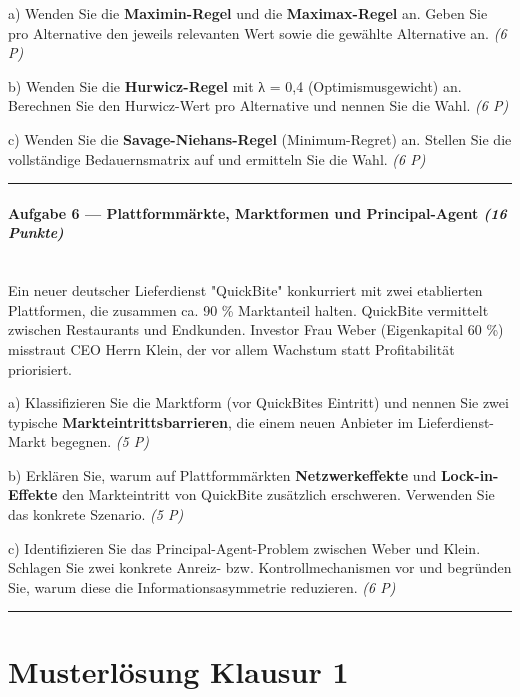 \documentclass[11pt, a4paper]{article}
\begin{document}
a) Wenden Sie die \textbf{Maximin-Regel} und die \textbf{Maximax-Regel} an. Geben Sie pro Alternative den jeweils relevanten Wert sowie die gewählte Alternative an. \textit{(6 P)}


b) Wenden Sie die \textbf{Hurwicz-Regel} mit λ = 0,4 (Optimismusgewicht) an. Berechnen Sie den Hurwicz-Wert pro Alternative und nennen Sie die Wahl. \textit{(6 P)}


c) Wenden Sie die \textbf{Savage-Niehans-Regel} (Minimum-Regret) an. Stellen Sie die vollständige Bedauernsmatrix auf und ermitteln Sie die Wahl. \textit{(6 P)}



\noindent\textcolor{rulegray}{\rule{\linewidth}{0.4pt}}


\paragraph{Aufgabe 6 — Plattformmärkte, Marktformen und Principal-Agent \textit{(16 Punkte)}}\mbox{}\\[2pt]

Ein neuer deutscher Lieferdienst "QuickBite" konkurriert mit zwei etablierten Plattformen, die zusammen ca. 90 \% Marktanteil halten. QuickBite vermittelt zwischen Restaurants und Endkunden. Investor Frau Weber (Eigenkapital 60 \%) misstraut CEO Herrn Klein, der vor allem Wachstum statt Profitabilität priorisiert.


a) Klassifizieren Sie die Marktform (vor QuickBites Eintritt) und nennen Sie zwei typische \textbf{Markteintrittsbarrieren}, die einem neuen Anbieter im Lieferdienst-Markt begegnen. \textit{(5 P)}


b) Erklären Sie, warum auf Plattformmärkten \textbf{Netzwerkeffekte} und \textbf{Lock-in-Effekte} den Markteintritt von QuickBite zusätzlich erschweren. Verwenden Sie das konkrete Szenario. \textit{(5 P)}


c) Identifizieren Sie das Principal-Agent-Problem zwischen Weber und Klein. Schlagen Sie zwei konkrete Anreiz- bzw. Kontrollmechanismen vor und begründen Sie, warum diese die Informationsasymmetrie reduzieren. \textit{(6 P)}



\noindent\textcolor{rulegray}{\rule{\linewidth}{0.4pt}}



\section{Musterlösung Klausur 1}
\end{document}
